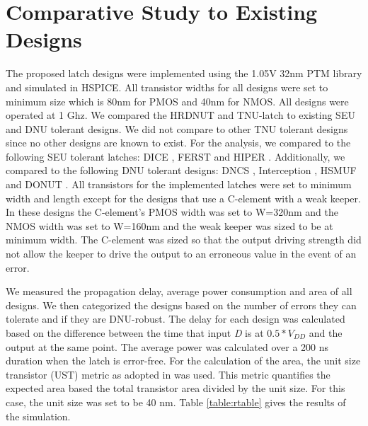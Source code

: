 \section{Comparative Study to Existing Designs} \label{sec:res}

The proposed latch designs were implemented using the 1.05V 32nm PTM library \cite{PTM} and simulated in HSPICE. All transistor widths for all designs were set to minimum size which is 80nm for PMOS and 40nm for NMOS. All designs were operated at 1 Ghz. We compared the HRDNUT and TNU-latch to existing SEU and DNU tolerant designs. We did not compare to other TNU tolerant designs since no other designs are known to exist. For the analysis, we compared to the following SEU tolerant latches: DICE \cite{DICE}, FERST \cite{FERST} and HIPER \cite{HIPER}. Additionally, we compared to the following DNU tolerant designs: DNCS \cite{DNCS}, Interception \cite{Inter}, HSMUF \cite{HSMUF} and DONUT \cite{DONUT}. All transistors for the implemented latches were set to minimum width and length except for the designs that use a C-element with a weak keeper. In these designs the C-element's PMOS width was set to W=320nm and the NMOS width was set to W=160nm and the weak keeper was sized to be at minimum width. The C-element was sized so that the output driving strength did not allow the keeper to drive the output to an erroneous value in the event of an error. 

We measured the propagation delay, average power consumption and area of all designs. We then categorized the designs based on the number of errors they can tolerate and if they are DNU-robust. The delay for each design was calculated based on the difference between the time that input \textit{D} is at $0.5*V_{DD}$ and the output at the same point. The average power was calculated over a 200 ns duration when the latch is error-free. For the calculation of the area, the unit size transistor (UST) metric as adopted in \cite{DNCS} was used. This metric quantifies the expected area based the total transistor area divided by the unit size. For this case, the unit size was set to be 40 nm. Table \ref{table:rtable} gives the results of the simulation.

